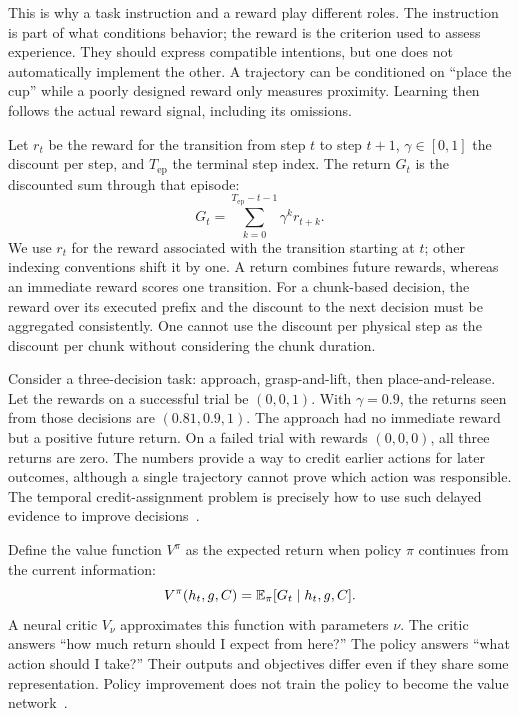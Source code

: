 This is why a task instruction and a reward play different roles. The instruction is part of what conditions behavior; the reward is the criterion used to assess experience. They should express compatible intentions, but one does not automatically implement the other. A trajectory can be conditioned on ``place the cup'' while a poorly designed reward only measures proximity. Learning then follows the actual reward signal, including its omissions.

Let $r_t$ be the reward for the transition from step $t$ to step $t+1$, $\gamma\in[0,1]$ the discount per step, and $T_{\mathrm{ep}}$ the terminal step index. The return $G_t$ is the discounted sum through that episode:
\begin{equation}
 G_t=\sum_{k=0}^{T_{\mathrm{ep}}-t-1}\gamma^k r_{t+k}.
 \label{eq:return}
\end{equation}
We use $r_t$ for the reward associated with the transition starting at $t$; other indexing conventions shift it by one. A return combines future rewards, whereas an immediate reward scores one transition. For a chunk-based decision, the reward over its executed prefix and the discount to the next decision must be aggregated consistently. One cannot use the discount per physical step as the discount per chunk without considering the chunk duration.

Consider a three-decision task: approach, grasp-and-lift, then place-and-release. Let the rewards on a successful trial be $(0,0,1)$. With $\gamma=0.9$, the returns seen from those decisions are $(0.81,0.9,1)$. The approach had no immediate reward but a positive future return. On a failed trial with rewards $(0,0,0)$, all three returns are zero. The numbers provide a way to credit earlier actions for later outcomes, although a single trajectory cannot prove which action was responsible. The temporal credit-assignment problem is precisely how to use such delayed evidence to improve decisions~\citep{rlintro}.

Define the value function $V^\pi$ as the expected return when policy $\pi$ continues from the current information:
\begin{equation}
 V^\pi(h_t,g,C)=\mathbb{E}_{\pi}[G_t\mid h_t,g,C].
 \label{eq:value}
\end{equation}
A neural critic $V_\nu$ approximates this function with parameters $\nu$. The critic answers ``how much return should I expect from here?'' The policy answers ``what action should I take?'' Their outputs and objectives differ even if they share some representation. Policy improvement does not train the policy to become the value network~\citep{rlintro}.


